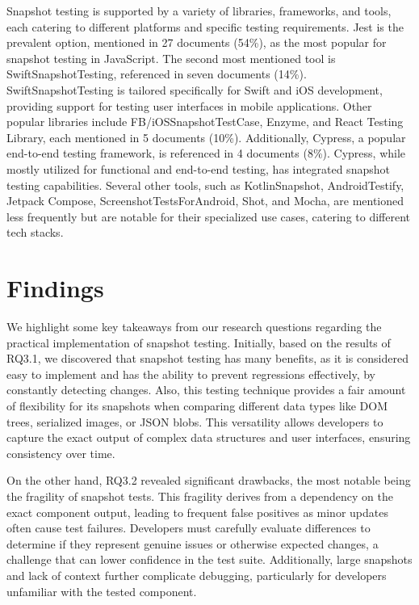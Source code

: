 \documentclass[
	msc, %
	english %
]{../ppgccufmg}
\begin{document}
        Snapshot testing is supported by a variety of libraries, frameworks, and tools, each catering to different platforms and specific testing requirements. Jest is the prevalent option, mentioned in 27 documents (54\%), as the most popular for snapshot testing in JavaScript. The second most mentioned tool is SwiftSnapshotTesting, referenced in seven documents (14\%). SwiftSnapshotTesting is tailored specifically for Swift and iOS development, providing support for testing user interfaces in mobile applications. Other popular libraries include FB/iOSSnapshotTestCase, Enzyme, and React Testing Library, each mentioned in 5 documents (10\%). Additionally, Cypress, a popular end-to-end testing framework, is referenced in 4 documents (8\%). Cypress, while mostly utilized for functional and end-to-end testing, has integrated snapshot testing capabilities.
        Several other tools, such as KotlinSnapshot, AndroidTestify, Jetpack Compose, ScreenshotTestsForAndroid, Shot, and Mocha, are mentioned less frequently but are notable for their specialized use cases, catering to different tech stacks.

        \section{Findings}\label{sec:ch3-key-findings}
        
        We highlight some key takeaways from our research questions regarding the practical implementation of snapshot testing. Initially, based on the results of RQ3.1, we discovered that snapshot testing has many benefits, as it is considered easy to implement and has the ability to prevent regressions effectively, by constantly detecting changes. Also, this testing technique provides a fair amount of flexibility for its snapshots when comparing different data types like DOM trees, serialized images, or JSON blobs. This versatility allows developers to capture the exact output of complex data structures and user interfaces, ensuring consistency over time.

        On the other hand, RQ3.2 revealed significant drawbacks, the most notable being the fragility of snapshot tests. This fragility derives from a dependency on the exact component output, leading to frequent false positives as minor updates often cause test failures. Developers must carefully evaluate differences to determine if they represent genuine issues or otherwise expected changes, a challenge that can lower confidence in the test suite. Additionally, large snapshots and lack of context further complicate debugging, particularly for developers unfamiliar with the tested component.\\
\end{document}

